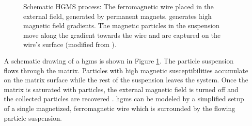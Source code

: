 \begin{figure}[H]
\centering

\caption[Schematic HGMS process]{Schematic HGMS process: The ferromagnetic wire placed in the external field, generated by permanent magnets, generates high magnetic field gradients. The magnetic particles in the suspension move along the gradient towards the wire and are captured on the wire's surface (modified from \cite{FranzrebHabil}).  
\label{fig:hgms}
}
\end{figure}

A schematic drawing of a \gls{hgms} is shown in Figure \ref{fig:hgms}. The particle suspension flows through the matrix. Particles with high magnetic susceptibilities accumulate on the matrix surface while the rest of the suspension leaves the system. Once the matrix is saturated with particles, the external magnetic field is turned off and the collected particles are recovered \cite{svoboda2004magnetic}\cite{gerber1983high}\cite{ditsch2005high}. \gls{hgms} can be modeled by a simplified setup of a single magnetized, ferromagnetic wire which is surrounded by the flowing particle suspension. %

